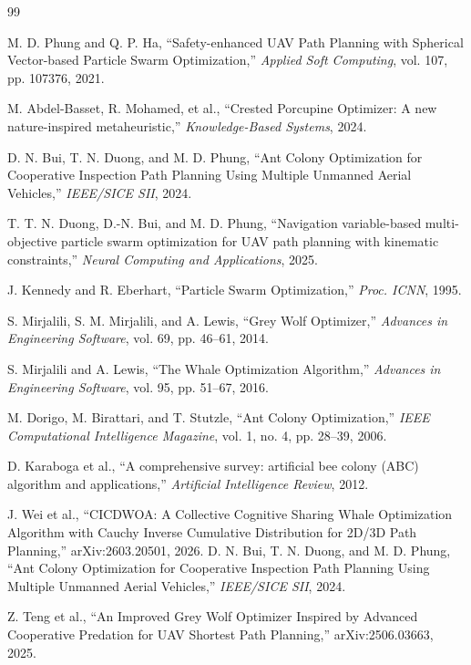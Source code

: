 \documentclass[12pt,a4paper]{article}
\begin{document}

\begin{thebibliography}{99}

M. D. Phung and Q. P. Ha, 
``Safety-enhanced UAV Path Planning with Spherical Vector-based Particle Swarm Optimization,''
\textit{Applied Soft Computing}, vol. 107, pp. 107376, 2021.

M. Abdel-Basset, R. Mohamed, et al.,
``Crested Porcupine Optimizer: A new nature-inspired metaheuristic,''
\textit{Knowledge-Based Systems}, 2024.

D. N. Bui, T. N. Duong, and M. D. Phung,
``Ant Colony Optimization for Cooperative Inspection Path Planning 
Using Multiple Unmanned Aerial Vehicles,''
\textit{IEEE/SICE SII}, 2024.

T. T. N. Duong, D.-N. Bui, and M. D. Phung,
``Navigation variable-based multi-objective particle swarm optimization 
for UAV path planning with kinematic constraints,''
\textit{Neural Computing and Applications}, 2025.

J. Kennedy and R. Eberhart,
``Particle Swarm Optimization,''
\textit{Proc. ICNN}, 1995.

S. Mirjalili, S. M. Mirjalili, and A. Lewis,
``Grey Wolf Optimizer,''
\textit{Advances in Engineering Software}, vol. 69, pp. 46--61, 2014.

S. Mirjalili and A. Lewis,
``The Whale Optimization Algorithm,''
\textit{Advances in Engineering Software}, vol. 95, pp. 51--67, 2016.

M. Dorigo, M. Birattari, and T. Stutzle,
``Ant Colony Optimization,''
\textit{IEEE Computational Intelligence Magazine}, vol. 1, no. 4, pp. 28--39, 2006.

D. Karaboga et al.,
``A comprehensive survey: artificial bee colony (ABC) algorithm and applications,''
\textit{Artificial Intelligence Review}, 2012.

J. Wei et al.,
``CICDWOA: A Collective Cognitive Sharing Whale Optimization Algorithm 
with Cauchy Inverse Cumulative Distribution for 2D/3D Path Planning,''
arXiv:2603.20501, 2026.
D. N. Bui, T. N. Duong, and M. D. Phung,
``Ant Colony Optimization for Cooperative Inspection Path Planning 
Using Multiple Unmanned Aerial Vehicles,''
\textit{IEEE/SICE SII}, 2024.

Z. Teng et al.,
``An Improved Grey Wolf Optimizer Inspired by Advanced Cooperative Predation 
for UAV Shortest Path Planning,''
arXiv:2506.03663, 2025.



\end{thebibliography}
\end{document}
